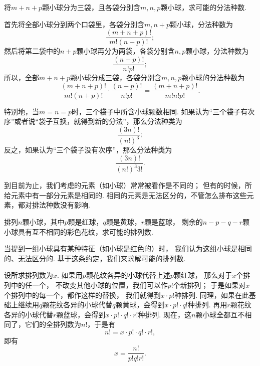 \begin{example}
将\(m+n+p\)颗小球分为三袋，且各袋分别含\(m,n,p\)颗小球，求可能的分法种数.
\begin{solution}
首先将全部小球分到两个口袋里，各袋分别含\(m,n+p\)颗小球，分法种数为\begin{equation*}
	\frac{(m+n+p)!}{m!(n+p)!};
\end{equation*}
然后将第二袋中的\(n+p\)颗小球再分为两袋，各袋分别含\(n,p\)颗小球，分法种数为\begin{equation*}
	\frac{(n+p)!}{n! p!};
\end{equation*}
所以，全部\(m+n+p\)颗小球分成三袋，各袋分别含\(m,n,p\)颗小球的分法种数为\begin{equation*}
	\frac{(m+n+p)!}{m!(n+p)!} \cdot \frac{(n+p)!}{n! p!}
	= \frac{(m+n+p)!}{m! n! p!}.
\end{equation*}

特别地，当\(m=n=p\)时，三个袋子中所含小球颗数相同.
如果认为“三个袋子有次序”或者说“袋子互换，就得到新的分法”，那么分法种类为\begin{equation*}
	\frac{(3n)!}{(n!)^3};
\end{equation*}
反之，如果认为“三个袋子没有次序”，那么分法种类为\begin{equation*}
	\frac{(3n)!}{(n!)^3 3!}.
\end{equation*}
\end{solution}
\end{example}

到目前为止，我们考虑的元素（如小球）常常被看作是不同的；
但有的时候，所给元素中有一部分元素是相同的.
相同的元素是无法区分的，不管怎么排布这些元素，都对排法种数没有影响.

\begin{example}
排列\(n\)颗小球，其中\(p\)颗是红球，\(q\)颗是黄球，\(r\)颗是蓝球，
剩余的\(n-p-q-r\)颗小球具有互不相同的彩色花纹，求可能的排列数.
\begin{solution}
当提到一组小球具有某种特征（如小球是红色的）时，
我们认为这组小球是相同的、无法区分的.
基于这条约定，我们来求解可能的排列数.

设所求排列数为\(x\).
如果用\(p\)颗花纹各异的小球代替上述\(p\)颗红球，
那么对于\(x\)个排列中的任一个，
不改变其他小球的位置，我们可以作\(p!\)个新排列；
于是如果对\(x\)个排列中的每一个，都作这样的替换，
我们就得到\(x \cdot p!\)种排列.
同理，如果在此基础上继续用\(q\)颗花纹各异的小球代替\(q\)颗黄球，会得到\(x \cdot p! \cdot q!\)种排列.
再用\(r\)颗花纹各异的小球代替\(r\)颗蓝球，会得到\(x \cdot p! \cdot q! \cdot r!\)种排列.
现在，这\(n\)颗小球全都互不相同了，它们的全排列数为\(n!\)，于是有\begin{equation*}
	n! = x \cdot p! \cdot q! \cdot r!,
\end{equation*}即有\begin{equation*}
	x = \frac{n!}{p! q! r!}.
\end{equation*}
\end{solution}
\end{example}

